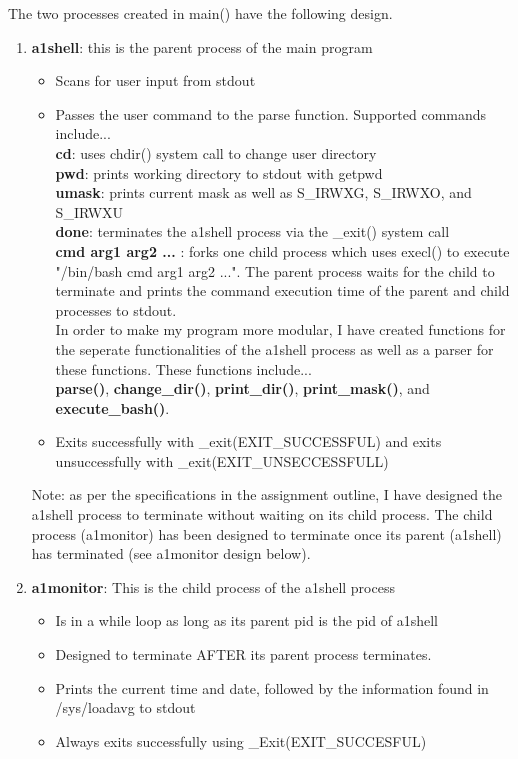 \documentclass{article}
\begin{document}
\noindent
The two processes created in main() have the following design.
\begin{enumerate}
  \item \textbf{a1shell}: this is the parent process of the main program
   \begin{itemize}
     \item Scans for user input from stdout
     \item Passes the user command to the parse function. Supported commands include...\\

     \textbf{cd}: uses chdir() system call to change user directory \\
     \textbf{pwd}: prints working directory to stdout with getpwd\\
     \textbf{umask}: prints current mask as well as S\_IRWXG, S\_IRWXO, and S\_IRWXU\\
     \textbf{done}: terminates the a1shell process via the \_exit() system call \\
     \textbf{cmd arg1 arg2 ...} : forks one child process which uses execl() to execute
     "/bin/bash cmd arg1 arg2 ...". The parent process waits for the child to terminate
     and prints the command execution time of the parent and child processes to
     stdout. \\

    \noindent
    In order to make my program more modular, I have created functions
    for the seperate functionalities of the a1shell process as well as
    a parser for these functions. These functions include... \\
    \textbf{parse()}, \textbf{change\_dir()}, \textbf{print\_dir()}, \textbf{print\_mask()},
    and \textbf{execute\_bash()}. \\

     \item Exits successfully with \_exit(EXIT\_SUCCESSFUL) and exits unsuccessfully
     with \_exit(EXIT\_UNSECCESSFULL)
   \end{itemize}

     Note: as per the specifications in the assignment outline, I have designed the a1shell
     process to terminate without waiting on its child process. The child process (a1monitor) has
     been designed to terminate once its parent (a1shell) has terminated (see a1monitor design
     below). \\
   \item \textbf{a1monitor}: This is the child process of the a1shell process
   \begin{itemize}
     \item Is in a while loop as long as its parent pid is the pid of a1shell
     \item Designed to terminate AFTER its parent process terminates.
     \item Prints the current time and date, followed by the information found
     in /sys/loadavg to stdout
     \item Always exits successfully using \_Exit(EXIT\_SUCCESFUL)
   \end{itemize}
\end{enumerate}
\end{document}
